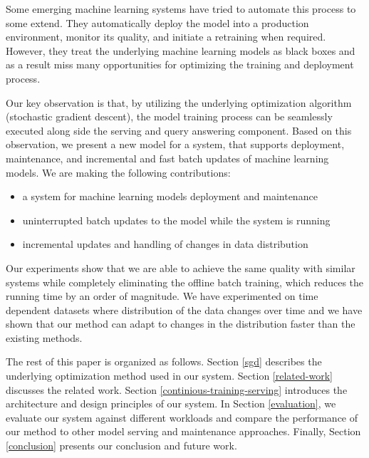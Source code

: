 \documentclass{vldb}
\begin{document}
Some emerging machine learning systems have tried to automate this process to some extend.
They automatically deploy the model into a production environment, monitor its quality, and initiate a retraining when required.
However, they treat the underlying machine learning models as black boxes and as a result miss many opportunities for optimizing the training and deployment process.

Our key observation is that, by utilizing the underlying optimization algorithm (stochastic gradient descent), the model training process can be seamlessly executed along side the serving and query answering component.
Based on this observation, we present a new model for a system, that supports deployment, maintenance, and incremental and fast batch updates of machine learning models.
We are making the following contributions: 
\begin{itemize}
\item a system for machine learning models deployment and maintenance
\item uninterrupted batch updates to the model while the system is running
\item incremental updates and handling of changes in data distribution
\end{itemize}
Our experiments show that we are able to achieve the same quality with similar systems while completely eliminating the offline batch training, which reduces the running time by an order of magnitude. 
We have experimented on time dependent datasets where distribution of the data changes over time and we have shown that our method can adapt to changes in the distribution faster than the existing methods.

The rest of this paper is organized as follows. 
Section \ref{sgd} describes the underlying optimization method used in our system. 
Section \ref {related-work} discusses the related work.
Section \ref{continious-training-serving} introduces the architecture and design principles of our system. 
In Section \ref{evaluation}, we evaluate our system against different workloads and compare the performance of our method to other model serving and maintenance approaches. 
Finally, Section \ref{conclusion} presents our conclusion and future work.
\end{document}
